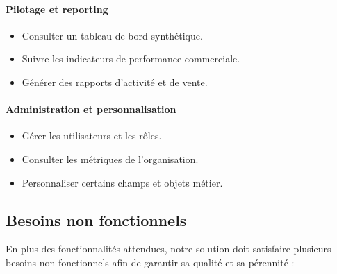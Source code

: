 \documentclass[12pt,a4paper]{report}
\begin{document}
\paragraph{Pilotage et reporting}
\begin{itemize}
    \item Consulter un tableau de bord synthétique.
    \item Suivre les indicateurs de performance commerciale.
    \item Générer des rapports d’activité et de vente.
\end{itemize}

\paragraph{Administration et personnalisation}
\begin{itemize}
    \item Gérer les utilisateurs et les rôles.
    \item Consulter les métriques de l’organisation.
    \item Personnaliser certains champs et objets métier.
\end{itemize}

\subsection{Besoins non fonctionnels}

En plus des fonctionnalités attendues, notre solution doit satisfaire plusieurs besoins non fonctionnels afin de garantir sa qualité et sa pérennité :
\end{document}
